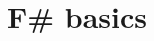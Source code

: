 \documentclass[fsharpnotes.tex]{subfiles}
\begin{document}
\part{F\# basics}
\label{part:basics}
\end{document}
